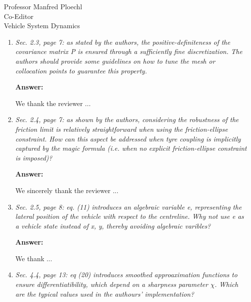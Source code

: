 \documentclass{letter}
\begin{document}
\begin{letter}{Professor Manfred Ploechl\\
Co-Editor\\
Vehicle System Dynamics}
\begin{enumerate}
\vspace{2mm}

\textbf{Answer:}

We thank the reviewer ...

\hrulefill

\item
\textit{Sec. 2.3, page 7: as stated by the authors, the positive-definiteness of the covariance matrix P is ensured through a sufficiently fine discretization. The authors should provide some guidelines on how to tune the mesh or collocation points to guarantee this property.
}

\vspace{2mm}

\textbf{Answer:}

We thank the reviewer ...

\hrulefill

\item
\textit{Sec. 2.4, page 7: as shown by the authors, considering the robustness of the friction limit is relatively straightforward when using the friction-ellipse constraint. How can this aspect be addressed when tyre coupling is implicitly captured by the magic formula (i.e. when no explicit friction-ellipse constraint is imposed)?}

\vspace{2mm}

\textbf{Answer:}

We sincerely thank the reviewer ...

\hrulefill

\item
\textit{Sec. 2.5, page 8: eq. (11) introduces an algebraic variable e, representing the lateral position of the vehicle with respect to the centreline. Why not use e as a vehicle state instead of x, y, thereby avoiding algebraic varibles?}

\vspace{2mm}

\textbf{Answer:}

We thank ...

\hrulefill

\item
\textit{Sec. 4.4, page 13: eq (20) introduces smoothed approaximation functions to ensure differentiatibility, which depend on a sharpness parameter $\chi$. Which are the typical values used in the authours' implementation?}

\vspace{2mm}


\end{enumerate}
\end{letter}
\end{document}
